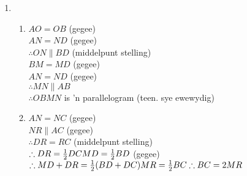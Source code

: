 \begin{eocsolutions}{}
{\begin{enumerate}[itemsep=5pt, label=\textbf{\arabic*}. ]
\item %
 \begin{enumerate}[noitemsep, label=\textbf{(\alph*)} ]
\item
$AO=OB$ (gegee)\\
$AN=ND$ (gegee)\\
$\therefore ON\parallel BD$ (middelpunt stelling)\\
$BM=MD$ (gegee)\\
$AN=ND$ (gegee)\\
$\therefore MN \parallel AB$\\
$\therefore OBMN$ is 'n parallelogram (teen. sye ewewydig)
\item 
$AN=NC$ (gegee)\\
$NR \parallel AC$ (gegee)\\
$\therefore DR=RC$ (middelpunt stelling)\\
$\therefore DR=\frac{1}{2} DC\\
MD=\frac{1}{2}BD$ (gegee)\\
$\therefore MD + DR = \frac{1}{2} (BD+DC)\\
MR = \frac{1}{2}BC\\
\therefore BC = 2MR$
\end{enumerate}


\end{enumerate}}
\end{eocsolutions}

